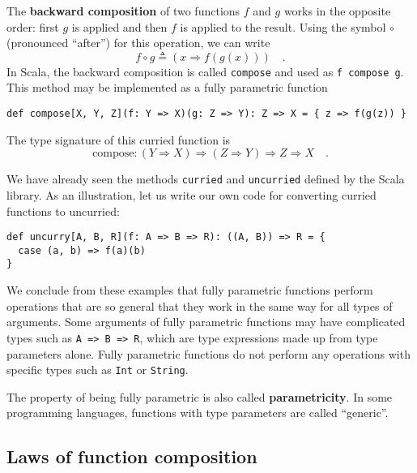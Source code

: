 The \textbf{backward composition} of
two functions $f$ and $g$ works in the opposite order: first $g$
is applied and then $f$ is applied to the result. Using the symbol
$\circ$ (pronounced ``after'') for this operation, we can write
\begin{equation}
f\circ g\triangleq\left(x\Rightarrow f(g(x))\right)\quad.\label{eq:def-of-backward-composition}
\end{equation}
In Scala, the backward composition is called \lstinline!compose!
and used as \lstinline!f compose g!. This method may be implemented
as a fully parametric function
\begin{lstlisting}
def compose[X, Y, Z](f: Y => X)(g: Z => Y): Z => X = { z => f(g(z)) }
\end{lstlisting}
The type signature of this curried function is
\[
\text{compose}:\left(Y\Rightarrow X\right)\Rightarrow\left(Z\Rightarrow Y\right)\Rightarrow Z\Rightarrow X\quad.
\]

We have already seen the methods \lstinline!curried! and \lstinline!uncurried!
defined by the Scala library. As an illustration, let us write our
own code for converting curried functions to uncurried:
\begin{lstlisting}
def uncurry[A, B, R](f: A => B => R): ((A, B)) => R = {
  case (a, b) => f(a)(b)
}
\end{lstlisting}

We conclude from these examples that fully parametric functions perform
operations that are so general that they work in the same way for
all types of arguments. Some arguments of fully parametric functions
may have complicated types such as \lstinline!A => B => R!, which
are type expressions made up from type parameters alone. Fully parametric
functions do not perform any operations with specific types such as
\lstinline!Int! or \lstinline!String!.

The property of being fully parametric is also called \textbf{parametricity}.
In some programming languages, functions with type parameters are
called ``generic''.

\subsection{Laws of function composition\label{subsec:Laws-of-function-composition}}

